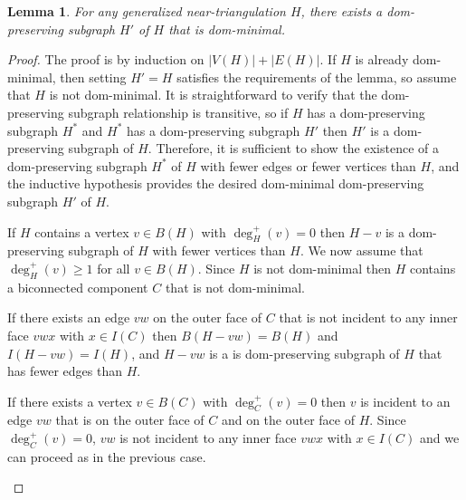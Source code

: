 \documentclass[12pt]{article}
\newtheorem{lem}{Lemma}
\theoremstyle{definition}
\begin{document}
\begin{lem}\label{dom_minimal}
  For any generalized near-triangulation $H$, there exists a dom-preserving subgraph $H'$ of $H$ that is dom-minimal.
\end{lem}

\begin{proof}
  The proof is by induction on $|V(H)|+|E(H)|$.  If $H$ is already dom-minimal, then setting $H'=H$ satisfies the requirements of the lemma, so assume that $H$ is not dom-minimal.  It is straightforward to verify that the dom-preserving subgraph relationship is transitive, so if $H$ has a dom-preserving subgraph $H^*$ and $H^*$ has a dom-preserving subgraph $H'$ then $H'$ is a dom-preserving subgraph of $H$.  Therefore, it is sufficient to show the existence of a dom-preserving subgraph $H^*$ of $H$ with fewer edges or fewer vertices than $H$, and the inductive hypothesis provides the desired dom-minimal dom-preserving subgraph $H'$ of $H$.

  If $H$ contains a vertex $v\in B(H)$ with $\deg^+_H(v)=0$ then $H-v$ is a dom-preserving subgraph of $H$ with fewer vertices than $H$.  We now assume that $\deg^+_H(v)\ge 1$ for all $v\in B(H)$.  Since $H$ is not dom-minimal then $H$ contains a biconnected component $C$ that is not dom-minimal.
  \begin{compactenum}
    \item If there exists an edge $vw$ on the outer face of $C$ that is not incident to any inner face $vwx$ with $x\in I(C)$ then $B(H-vw)=B(H)$ and $I(H-vw)=I(H)$, and $H-vw$ is a is dom-preserving subgraph of $H$ that has fewer edges than $H$.

    \item If there exists a vertex $v\in B(C)$ with $\deg^+_C(v)=0$ then $v$ is incident to an edge $vw$ that is on the outer face of $C$ and on the outer face of $H$. Since $\deg^+_C(v)=0$, $vw$ is not incident to any inner face $vwx$ with $x\in I(C)$ and we can proceed as in the previous case. \qedhere
  \end{compactenum}
\end{proof}
\end{document}
